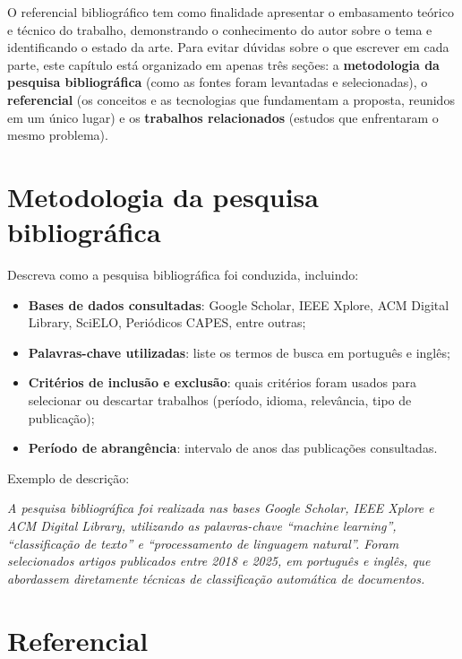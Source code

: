 \documentclass[
    12pt,                %
    openright,           %
    oneside,             %
    a4paper,             %
    english,             %
    brazil               %
]{abntex2}
\begin{document}
O referencial bibliográfico tem como finalidade apresentar o embasamento teórico e técnico do trabalho, demonstrando o conhecimento do autor sobre o tema e identificando o estado da arte. Para evitar dúvidas sobre o que escrever em cada parte, este capítulo está organizado em apenas três seções: a \textbf{metodologia da pesquisa bibliográfica} (como as fontes foram levantadas e selecionadas), o \textbf{referencial} (os conceitos e as tecnologias que fundamentam a proposta, reunidos em um único lugar) e os \textbf{trabalhos relacionados} (estudos que enfrentaram o mesmo problema).

\section{Metodologia da pesquisa bibliográfica}
\label{sec:metodologia_pesquisa}

Descreva como a pesquisa bibliográfica foi conduzida, incluindo:

\begin{itemize}
    \item \textbf{Bases de dados consultadas}: Google Scholar, IEEE Xplore, ACM Digital Library, SciELO, Periódicos CAPES, entre outras;
    \item \textbf{Palavras-chave utilizadas}: liste os termos de busca em português e inglês;
    \item \textbf{Critérios de inclusão e exclusão}: quais critérios foram usados para selecionar ou descartar trabalhos (período, idioma, relevância, tipo de publicação);
    \item \textbf{Período de abrangência}: intervalo de anos das publicações consultadas.
\end{itemize}

Exemplo de descrição:

\textit{A pesquisa bibliográfica foi realizada nas bases Google Scholar, IEEE Xplore e ACM Digital Library, utilizando as palavras-chave ``machine learning'', ``classificação de texto'' e ``processamento de linguagem natural''. Foram selecionados artigos publicados entre 2018 e 2025, em português e inglês, que abordassem diretamente técnicas de classificação automática de documentos.}

\section{Referencial}
\label{sec:referencial}
\end{document}
